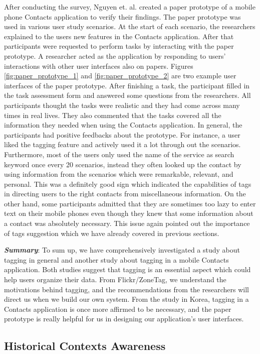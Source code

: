 After conducting the survey, Nguyen et. al. created a paper prototype of a mobile phone Contacts application to verify their findings. The paper prototype was used in various user study scenarios. At the start of each scenario, the researchers explained to the users new features in the Contacts application. After that participants were requested to perform tasks by interacting with the paper prototype. A researcher acted as the application by responding to users' interactions with other user interfaces also on papers. Figures \ref{fig:paper_prototype_1} and \ref{fig:paper_prototype_2} are two example user interfaces of the paper prototype. After finishing a task, the participant filled in the task assessment form and answered some questions from the researchers. All participants thought the tasks were realistic and they had come across many times in real lives. They also commented that the tasks covered all the information they needed when using the Contacts application. In general, the participants had positive feedbacks about the prototype. For instance, a user liked the tagging feature and actively used it a lot through out the scenarios. Furthermore, most of the users only used the name of the service as search keyword once every 20 scenarios, instead they often looked up the contact by using information from the scenarios which were remarkable, relevant, and personal. This was a definitely good sign which indicated the capabilities of tags in directing users to the right contacts from miscellaneous information. On the other hand, some participants admitted that they are sometimes too lazy to enter text on their mobile phones even though they knew that some information about a contact was absolutely necessary. This issue again pointed out the importance of tags suggestion which we have already covered in previous sections.

\textit{\textbf{Summary}}: To sum up, we have comprehensively investigated a study about tagging in general and another study about tagging in a mobile Contacts application. Both studies suggest that tagging is an essential aspect which could help users organize their data. From Flickr/ZoneTag, we understand the motivations behind tagging, and the recommendations from the researchers will direct us when we build our own system. From the study in Korea, tagging in a Contacts application is once more affirmed to be necessary, and the paper prototype is really helpful for us in designing our application's user interfaces.

\subsection{Historical Contexts Awareness}
\label{section:Context_Awareness}

